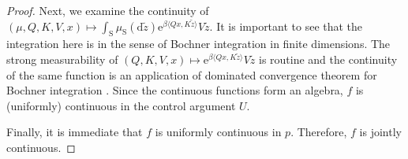 \documentclass[11pt]{article}
\newcommand{\inner}[2]{\langle#1, #2\rangle}
\newcommand{\e}{\mathrm{e}} %
\newcommand{\de}{\mathrm{d}} %
\begin{document}
\begin{proof}
    Next, we examine the continuity of $(\mu, Q, K, V, x) \mapsto \int_\mathrm{S} \mu_{\mathrm{S}}(\de \tilde{z}) \e^{\beta\inner{Qx}{K\tilde{z}}}V\tilde{z}$. It is important to see that the integration here is in the sense of Bochner integration in finite dimensions. The strong measurability of $(Q, K, V, x)\mapsto\e^{\beta\inner{Qx}{K\tilde{z}}}V\tilde{z}$ is routine and the continuity of the same function is an application of dominated convergence theorem for Bochner integration \cite[Theorem E.6]{cohn2013measure}. Since the continuous functions form an algebra, $f$ is (uniformly) continuous in the control argument $U$.
    
    Finally, it is immediate that $f$ is uniformly continuous in $p$. Therefore, $f$ is jointly continuous.
\end{proof}
\end{document}
